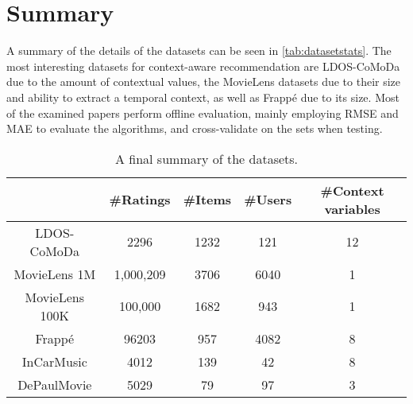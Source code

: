 \section{Summary}
A summary of the details of the datasets can be seen in \autoref{tab:datasetstats}.
The most interesting datasets for context-aware recommendation are LDOS-CoMoDa due to the amount of contextual values, the MovieLens datasets due to their size and ability to extract a temporal context, as well as Frappé due to its size.
Most of the examined papers perform offline evaluation, mainly employing RMSE and MAE to evaluate the algorithms, and cross-validate on the sets when testing.

\begin{table}
    \centering
    \begin{tabular}{|c|c|c|c|c|} 
    \hline
               & \#Ratings & \#Items & \#Users & \#Context variables  \\ 
    \hline
    LDOS-CoMoDa    & 2296      & 1232    & 121     & 12                   \\ 
    \hline
    MovieLens 1M   & 1,000,209 & 3706    & 6040    & 1                    \\ 
    \hline
    MovieLens 100K & 100,000   & 1682    & 943     & 1                    \\ 
    \hline
    Frappé         & 96203     & 957     & 4082    & 8                    \\ 
    \hline
    InCarMusic     & 4012      & 139     & 42      & 8                    \\ 
    \hline
    DePaulMovie    & 5029      & 79      & 97      & 3                    \\
    \hline
    \end{tabular}
    \caption{A final summary of the datasets.}
    \label{tab:datasetstats}
\end{table}
